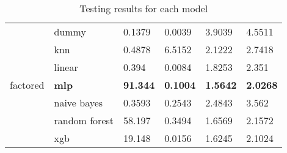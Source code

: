 \begin{table}[H]
\begin{tabular}{ll|llll}
                              \midrule
    \multirow{7}{*}{factored} & dummy         & 0.1379          & 0.0039          & 3.9039          & 4.5511          \\
                              & knn           & 0.4878          & 6.5152          & 2.1222          & 2.7418          \\
                              & linear        & 0.394           & 0.0084          & 1.8253          & 2.351           \\
                              & \textbf{mlp}  & \textbf{91.344} & \textbf{0.1004} & \textbf{1.5642} & \textbf{2.0268} \\
                              & naive bayes   & 0.3593          & 0.2543          & 2.4843          & 3.562           \\
                              & random forest & 58.197          & 0.3494          & 1.6569          & 2.1572          \\
                              & xgb           & 19.148          & 0.0156          & 1.6245          & 2.1024          \\
    \bottomrule
    \end{tabular}
    \caption{Testing results for each model}
    \label{tab:test_res}
    \end{table}